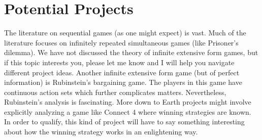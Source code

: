 \documentclass[11pt]{article}
\theoremstyle{definition}
\theoremstyle{plain}
\begin{document}
\section{Potential Projects}
The literature on sequential games (as one might expect) is vast. Much of the literature focuses on infinitely repeated simultaneous games (like Prisoner's dilemma). We have not discussed the theory of infinite extensive form games, but if this topic interests you, please let me know and I will help you navigate different project ideas. Another infinite extensive form game (but of perfect information) is Rubinstein's bargaining game. The players in this game have  continuous action sets which further complicates matters. Nevertheless, Rubinstein's analysis is fascinating. More down to Earth projects might involve explicitly analyzing a game like Connect 4 where winning strategies are known. In order to qualify, this kind of project will have to say something interesting about how the winning strategy works in an enlightening way. 
\end{document}
